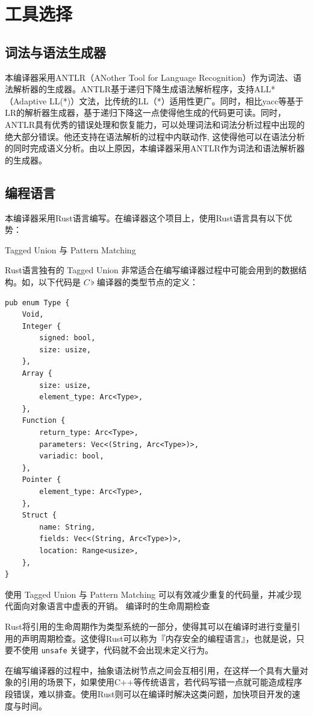 \documentclass{ctexrep}
\newcommand{\cb}{$C\,\flat$\xspace}
\begin{document}
\begin{verbatim}
\end{verbatim}

\section{工具选择}


\subsection{词法与语法生成器}
本编译器采用ANTLR\cite{parrANTLRPredicatedLLParser1995}（ANother Tool for Language Recognition）作为词法、语法解析器的生成器。ANTLR基于递归下降生成语法解析程序，支持ALL*（Adaptive LL(*)）文法，比传统的LL（*）适用性更广。同时，相比yacc等基于LR的解析器生成器，基于递归下降这一点使得他生成的代码更可读。同时，ANTLR具有优秀的错误处理和恢复能力，可以处理词法和词法分析过程中出现的绝大部分错误。他还支持在语法解析的过程中内联动作, 这使得他可以在语法分析的同时完成语义分析。由以上原因，本编译器采用ANTLR作为词法和语法解析器的生成器。

\subsection{编程语言}
本编译器采用Rust语言编写。在编译器这个项目上，使用Rust语言具有以下优势：
\begin{outline}
    \1 Tagged Union 与 Pattern Matching

        Rust语言独有的 Tagged Union 非常适合在编写编译器过程中可能会用到的数据结构。如，以下代码是 \cb 编译器的类型节点的定义：
\begin{verbatim}
pub enum Type {
    Void,
    Integer {
        signed: bool,
        size: usize,
    },
    Array {
        size: usize,
        element_type: Arc<Type>,
    },
    Function {
        return_type: Arc<Type>,
        parameters: Vec<(String, Arc<Type>)>,
        variadic: bool,
    },
    Pointer {
        element_type: Arc<Type>,
    },
    Struct {
        name: String,
        fields: Vec<(String, Arc<Type>)>,
        location: Range<usize>,
    },
}
\end{verbatim}
        使用 Tagged Union 与 Pattern Matching 可以有效减少重复的代码量，并减少现代面向对象语言中虚表的开销。
    \1 编译时的生命周期检查

        Rust将引用的生命周期作为类型系统的一部分，使得其可以在编译时进行变量引用的声明周期检查。这使得Rust可以称为『内存安全的编程语言』，也就是说，只要不使用 \texttt{unsafe} 关键字，代码就不会出现未定义行为。

        在编写编译器的过程中，抽象语法树节点之间会互相引用，在这样一个具有大量对象的引用的场景下，如果使用C++等传统语言，若代码写错一点就可能造成程序段错误，难以排查。使用Rust则可以在编译时解决这类问题，加快项目开发的速度与时间。
\end{outline}
\end{document}
